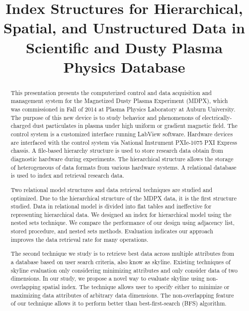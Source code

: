 \documentclass[12pt]{report}
\title{Index Structures for Hierarchical, Spatial, and Unstructured Data in Scientific and Dusty Plasma Physics Database}
\begin{document}
\begin{romanpages}      %

\TitlePage 

\begin{abstract}
This presentation presents the computerized control and data acquisition and management system for the Magnetized Dusty Plasma Experiment (MDPX), which was commissioned in Fall of 2014 at Plasma Physics Laboratory at Auburn University. The purpose of this new device is to study behavior and phenomenons of electrically-charged dust particulates in plasma under high uniform or gradient magnetic field. The control system is a customized interface running LabView software. Hardware devices are interfaced with the control system via National Instrument PXIe-1075 PXI Express chassis. A file-based hierarchy structure is used to store research data obtain from diagnostic hardware during experiments. The hierarchical structure allows the storage of heterogeneous of data formats from various hardware systems. A relational database is used to index and retrieval research data.

Two relational model structures and data retrieval techniques are studied and optimized. Due to the hierarchical structure of the MDPX data, it is the first structure studied. Data in relational model is divided into flat tables and ineffective for representing hierarchical data. We designed an index for hierarchical model using the nested sets technique. We compare the performance of our design using adjacency list, stored procedure, and nested sets methods. Evaluation indicates our approach improves the data retrieval rate for many operations.

The second technique we study is to retrieve best data across multiple attributes from a database based on user search criteria, also know as skyline. Existing techniques of skyline evaluation only considering minimizing attributes and only consider data of two dimensions. In our study, we propose a novel way to evaluate skyline using non-overlapping spatial index. The technique allows user to specify either to minimize or maximizing data attributes of arbitrary data dimensions. The non-overlapping feature of our technique allows it to perform better than best-first-search (BFS) algorithm.

\end{abstract}


\end{romanpages}
\end{document}
